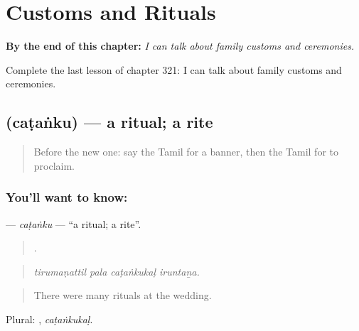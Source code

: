 
\chapter{Customs and Rituals}
\label{ch:ta-customs-and-rituals}

\begin{chapteropening}
\textbf{By the end of this chapter:} \emph{I can talk about family customs and ceremonies.}

Complete the last lesson of chapter 321: I can talk about family customs and ceremonies.
\end{chapteropening}

\section[\texorpdfstring{\ta{சடங்கு} (caṭaṅku)}{சடங்கு (caṭaṅku)}]{ (caṭaṅku) — a ritual; a rite}

\label{lesson:TA-C321-catanku}



\begin{quote}
Before the new one: say the Tamil for a banner, then the Tamil for to proclaim.
\end{quote}

\subsection*{You'll want to know: }
\textbf{} — \emph{caṭaṅku} — \textquotedblleft{}a ritual; a rite\textquotedblright{}.

\begin{quote}
   .
\end{quote}

\begin{quote}
\emph{tirumaṇattil pala caṭaṅkukaḷ iruntaṉa.}
\end{quote}

\begin{quote}
There were many rituals at the wedding.
\end{quote}

Plural: , \emph{caṭaṅkukaḷ}.

